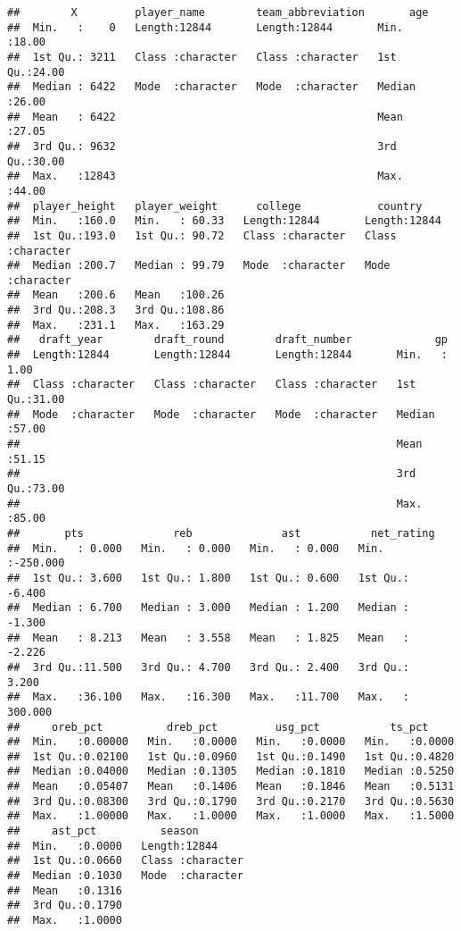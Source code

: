 \documentclass[
]{book}
\theoremstyle{definition}
\theoremstyle{definition}
\theoremstyle{definition}
\theoremstyle{definition}
\theoremstyle{remark}
\begin{document}
\begin{verbatim}
##        X         player_name        team_abbreviation       age       
##  Min.   :    0   Length:12844       Length:12844       Min.   :18.00  
##  1st Qu.: 3211   Class :character   Class :character   1st Qu.:24.00  
##  Median : 6422   Mode  :character   Mode  :character   Median :26.00  
##  Mean   : 6422                                         Mean   :27.05  
##  3rd Qu.: 9632                                         3rd Qu.:30.00  
##  Max.   :12843                                         Max.   :44.00  
##  player_height   player_weight      college            country         
##  Min.   :160.0   Min.   : 60.33   Length:12844       Length:12844      
##  1st Qu.:193.0   1st Qu.: 90.72   Class :character   Class :character  
##  Median :200.7   Median : 99.79   Mode  :character   Mode  :character  
##  Mean   :200.6   Mean   :100.26                                        
##  3rd Qu.:208.3   3rd Qu.:108.86                                        
##  Max.   :231.1   Max.   :163.29                                        
##   draft_year        draft_round        draft_number             gp       
##  Length:12844       Length:12844       Length:12844       Min.   : 1.00  
##  Class :character   Class :character   Class :character   1st Qu.:31.00  
##  Mode  :character   Mode  :character   Mode  :character   Median :57.00  
##                                                           Mean   :51.15  
##                                                           3rd Qu.:73.00  
##                                                           Max.   :85.00  
##       pts              reb              ast           net_rating      
##  Min.   : 0.000   Min.   : 0.000   Min.   : 0.000   Min.   :-250.000  
##  1st Qu.: 3.600   1st Qu.: 1.800   1st Qu.: 0.600   1st Qu.:  -6.400  
##  Median : 6.700   Median : 3.000   Median : 1.200   Median :  -1.300  
##  Mean   : 8.213   Mean   : 3.558   Mean   : 1.825   Mean   :  -2.226  
##  3rd Qu.:11.500   3rd Qu.: 4.700   3rd Qu.: 2.400   3rd Qu.:   3.200  
##  Max.   :36.100   Max.   :16.300   Max.   :11.700   Max.   : 300.000  
##     oreb_pct          dreb_pct         usg_pct           ts_pct      
##  Min.   :0.00000   Min.   :0.0000   Min.   :0.0000   Min.   :0.0000  
##  1st Qu.:0.02100   1st Qu.:0.0960   1st Qu.:0.1490   1st Qu.:0.4820  
##  Median :0.04000   Median :0.1305   Median :0.1810   Median :0.5250  
##  Mean   :0.05407   Mean   :0.1406   Mean   :0.1846   Mean   :0.5131  
##  3rd Qu.:0.08300   3rd Qu.:0.1790   3rd Qu.:0.2170   3rd Qu.:0.5630  
##  Max.   :1.00000   Max.   :1.0000   Max.   :1.0000   Max.   :1.5000  
##     ast_pct          season         
##  Min.   :0.0000   Length:12844      
##  1st Qu.:0.0660   Class :character  
##  Median :0.1030   Mode  :character  
##  Mean   :0.1316                     
##  3rd Qu.:0.1790                     
##  Max.   :1.0000
\end{verbatim}
\end{document}
